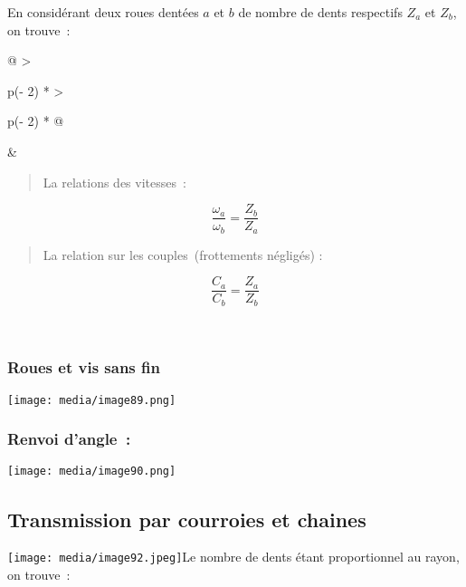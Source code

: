 \documentclass[
]{article}
\begin{document}
En considérant deux roues dentées \(a\) et \(b\) de nombre de dents
respectifs \(Z_{a}\) et \(Z_{b}\), on trouve~:

\begin{longtable}[]{@{}
  >{\raggedright\arraybackslash}p{(\columnwidth - 2\tabcolsep) * }
  >{\raggedright\arraybackslash}p{(\columnwidth - 2\tabcolsep) * }@{}}
\toprule
\endhead
& \begin{minipage}[t]{\linewidth}\raggedright
\begin{quote}
La relations des vitesses~:
\end{quote}

\[\boxed{\frac{\omega_{a}}{\omega_{b}} = \frac{Z_{b}}{Z_{a}}}\]

\begin{quote}
La relation sur les couples~\(
\)(frottements négligés) :
\end{quote}

\[\boxed{\frac{C_{a}}{C_{b}} = \frac{Z_{a}}{Z_{b}}}\]
\end{minipage} \\
\bottomrule
\end{longtable}

\hypertarget{roues-et-vis-sans-fin}{%
\subsubsection{Roues et vis sans fin}\label{roues-et-vis-sans-fin}}

\texttt{[image: media/image89.png]}

\hypertarget{renvoi-dangle}{%
\subsubsection{Renvoi d'angle~:}\label{renvoi-dangle}}

\texttt{[image: media/image90.png]}

\hypertarget{transmission-par-courroies-et-chaines}{%
\subsection{Transmission par courroies et
chaines}\label{transmission-par-courroies-et-chaines}}

\texttt{[image: media/image92.jpeg]}Le
nombre de dents étant proportionnel au rayon, on trouve~:
\end{document}
